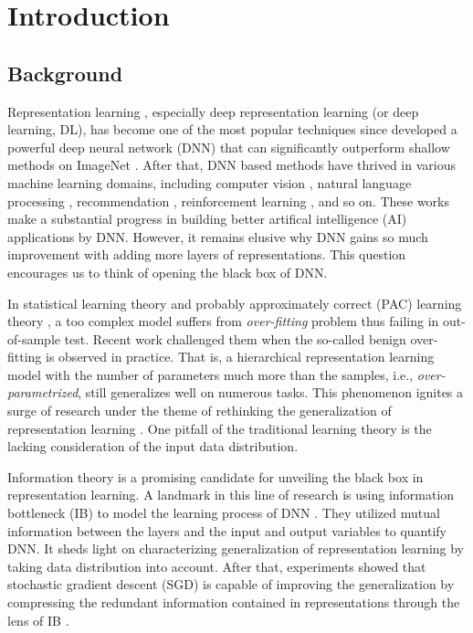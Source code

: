 

\chapter{Introduction}

\section{Background}
Representation learning \cite{bengio2013representation}, especially deep representation learning (or deep learning, DL), has become one of the most popular techniques since \citet{krizhevsky2012imagenet} developed a powerful deep neural network (DNN) that can significantly outperform shallow methods on ImageNet \cite{deng2009imagenet}. After that, DNN based methods have thrived in various machine learning domains, including computer vision \cite{simonyan2014very}, natural language processing \cite{kim-2014-convolutional}, recommendation \cite{cheng2016wide}, reinforcement learning \cite{silver2016mastering}, and so on. These works make a substantial progress in building better artifical intelligence (AI) applications by DNN. However, it remains elusive why DNN gains so much improvement with adding more layers of representations. This question encourages us to think of opening the black box of DNN.

In statistical learning theory \cite{vapnik2013nature} and probably approximately correct (PAC) learning theory \cite{valiant1984theory}, a too complex model suffers from \emph{over-fitting} problem thus failing in out-of-sample test. Recent work challenged them when the so-called benign over-fitting is observed in practice. That is, a hierarchical representation learning model with the number of parameters much more than the samples, i.e., \emph{over-parametrized}, still generalizes well on numerous tasks. This phenomenon ignites a surge of research under the theme of rethinking the generalization of representation learning \cite{zhang2016understanding}. One pitfall of the traditional learning theory is the lacking consideration of the input data distribution. 

Information theory \cite{cover1999elements} is a promising candidate for unveiling the black box in representation learning. A landmark in this line of research is using information bottleneck (IB) to model the learning process of DNN \cite{tishby2000information, tishby2015deep}. They utilized mutual information between the layers and the input and output variables to quantify DNN. It sheds light on characterizing generalization of representation learning by taking data distribution into account. After that, experiments showed that stochastic gradient descent (SGD) is capable of improving the generalization by compressing the redundant information contained in representations through the lens of IB \cite{shwartz2017opening}.

